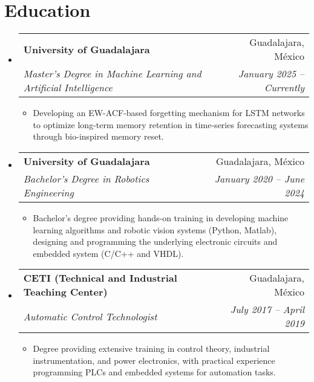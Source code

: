 \documentclass[a4paper,11pt]{article}
\makeatletter
\newcommand{\resumeItem}[1]{
  \item\small{
    {#1 \vspace{-2pt}}
  }
}
\newcommand{\resumeSubheading}[4]{
  \vspace{-2pt}\item
    \begin{tabular*}{1\textwidth}[t]{l@{\extracolsep{\fill}}r}
      \textbf{#1} & #2 \\
      \textit{\small#3} & \textit{\small #4} \\
    \end{tabular*}\vspace{-4pt}
}
\newcommand{\resumeSubHeadingListStart}{\begin{itemize}[leftmargin=0in, label={}]}
\newcommand{\resumeSubHeadingListEnd}{\end{itemize}}
\newcommand{\resumeItemListStart}{\begin{itemize}[leftmargin=0.15in, nosep]}
\newcommand{\resumeItemListEnd}{\end{itemize}\vspace{-2pt}}
\makeatother
\begin{document}
\section{\Large{Education}}
  \resumeSubHeadingListStart
    \resumeSubheading
      {University of Guadalajara}{Guadalajara, México}
      {Master's Degree in Machine Learning and Artificial Intelligence}{January 2025 -- Currently}
      \resumeItemListStart
        \resumeItem{Developing an EW-ACF-based forgetting mechanism for LSTM networks to optimize long-term memory retention in time-series forecasting systems through bio-inspired memory reset.}
      \resumeItemListEnd
    \resumeSubheading
      {University of Guadalajara}{Guadalajara, México}
      {Bachelor's Degree in Robotics Engineering}{January 2020 -- June 2024}
      \resumeItemListStart
        \resumeItem{Bachelor's degree providing hands-on training in developing machine learning algorithms and robotic vision systems (Python, Matlab), designing and programming the underlying electronic circuits and embedded system (C/C++ and VHDL).}
      \resumeItemListEnd
    \resumeSubheading
      {CETI (Technical and Industrial Teaching Center)}{Guadalajara, México}
      {Automatic Control Technologist}{July 2017 -- April 2019}
      \resumeItemListStart
        \resumeItem{Degree providing extensive training in control theory, industrial instrumentation, and power electronics, with practical experience programming PLCs and embedded systems for automation tasks.}
      \resumeItemListEnd
  \resumeSubHeadingListEnd
\vspace{-16pt}


\end{document}
